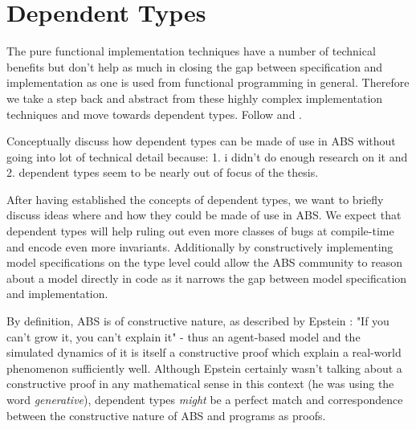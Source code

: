 \chapter{Dependent Types}
\label{ch:depTypes}


The pure functional implementation techniques have a number of technical benefits but don't help as much in closing the gap between specification and implementation as one is used from functional programming in general. Therefore we take a step back and abstract from these highly complex implementation techniques and move towards dependent types. Follow \cite{botta_time_2010} and \cite{botta_functional_2011}.

Conceptually discuss how dependent types can be made of use in ABS without going into lot of technical detail because: 1. i didn't do enough research on it and 2. dependent types seem to be nearly out of focus of the thesis.



After having established the concepts of dependent types, we want to briefly discuss ideas where and how they could be made of use in ABS. We expect that dependent types will help ruling out even more classes of bugs at compile-time and encode even more invariants. Additionally by constructively implementing model specifications on the type level could allow the ABS community to reason about a model directly in code as it narrows the gap between model specification and implementation.

By definition, ABS is of constructive nature, as described by Epstein \cite{epstein_chapter_2006}: "If you can't grow it, you can't explain it" - thus an agent-based model and the simulated dynamics of it is itself a constructive proof which explain a real-world phenomenon sufficiently well. Although Epstein certainly wasn't talking about a constructive proof in any mathematical sense in this context (he was using the word \textit{generative}), dependent types \textit{might} be a perfect match and correspondence between the constructive nature of ABS and programs as proofs.

